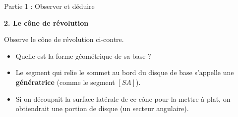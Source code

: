 \documentclass[a4paper]{book}
\begin{document}
\begin{exerciceTitre}{Partie 1 : Observer et déduire}
\begin{minipage}{0.4\textwidth}
        \end{minipage}
        
        \vspace{0.4cm}
        
        \textbf{2. Le cône de révolution} \\
        \begin{minipage}{0.55\textwidth}
            Observe le cône de révolution ci-contre.
            \begin{itemize}
                \item Quelle est la forme géométrique de sa base ? \dotfill
                \item Le segment qui relie le sommet au bord du disque de base s'appelle une \textbf{génératrice} (comme le segment $[SA]$).
                \item Si on découpait la surface latérale de ce cône pour la mettre à plat, on obtiendrait une portion de disque (un secteur angulaire).
            \end{itemize}
        \end{minipage}
        \hfill
        \begin{minipage}{0.4\textwidth}
            \centering
        \end{minipage}
    \end{exerciceTitre}

\vspace{0.4cm}
\end{document}
